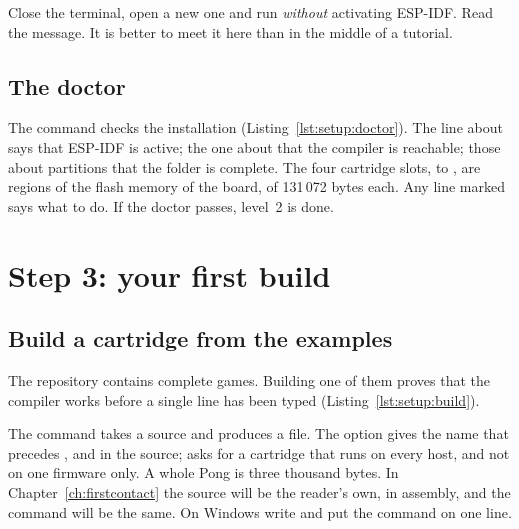 
\begin{prgtry}
Close the terminal, open a new one and run 
\emph{without} activating ESP-IDF. Read the message. It is better to meet it
here than in the middle of a tutorial.
\end{prgtry}

\subsection{The doctor}

The command  checks the installation
(Listing~\ref{lst:setup:doctor}). The line about  says that
ESP-IDF is active; the one about  that the \riscv
compiler is reachable; those about partitions that the \prg folder is
complete. The four cartridge slots,  to , are regions
of the flash memory of the board, of 131\,072 bytes each. Any line marked
 says what to do. If the doctor passes, level~2 is done.


\section{Step 3: your first build}\label{sec:setup:build}

\subsection{Build a cartridge from the examples}

The repository contains complete games. Building one of them proves that the
compiler works before a single line has been typed
(Listing~\ref{lst:setup:build}).


The command  takes a source and produces a
 file. The option  gives the name that
precedes ,  and  in the source;
 asks for a cartridge that runs on every host, and not on
one firmware only. A whole Pong is three thousand bytes. In
Chapter~\ref{ch:firstcontact} the source will be the reader's own, in
assembly, and the command will be the same. On Windows write 
and put the command on one line.

